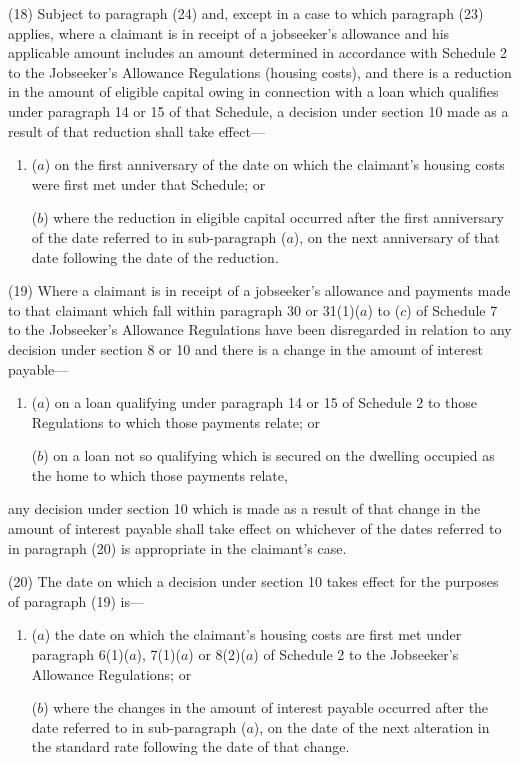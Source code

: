 \documentclass[12pt,a4paper]{article}
\begin{document}
(18) Subject to paragraph (24) and, except in a case to which paragraph (23) applies, where a claimant is in receipt of a jobseeker’s allowance and his applicable amount includes an amount determined in accordance with Schedule 2 to the Jobseeker’s Allowance Regulations (housing costs), and there is a reduction in the amount of eligible capital owing in connection with a loan which qualifies under paragraph 14 or 15 of that Schedule, a decision under section 10 made as a result of that reduction shall take effect—
\begin{enumerate}\item[]
($a$) on the first anniversary of the date on which the claimant’s housing costs were first met under that Schedule; or

($b$) where the reduction in eligible capital occurred after the first anniversary of the date referred to in sub-paragraph ($a$), on the next anniversary of that date following the date of the reduction.
\end{enumerate}

(19) Where a claimant is in receipt of a jobseeker’s allowance and payments made to that claimant which fall within paragraph 30 or 31(1)($a$) to ($c$) of Schedule 7 to the Jobseeker’s Allowance Regulations have been disregarded in relation to any decision under section 8 or 10 and there is a change in the amount of interest payable—
\begin{enumerate}\item[]
($a$) on a loan qualifying under paragraph 14 or 15 of Schedule 2 to those Regulations to which those payments relate; or

($b$) on a loan not so qualifying which is secured on the dwelling occupied as the home to which those payments relate,
\end{enumerate}
any decision under section 10 which is made as a result of that change in the amount of interest payable shall take effect on whichever of the dates referred to in paragraph (20) is appropriate in the claimant’s case.

(20) The date on which a decision under section 10 takes effect for the purposes of paragraph (19) is—
\begin{enumerate}\item[]
($a$) the date on which the claimant’s housing costs are first met under paragraph 6(1)($a$), 7(1)($a$) or 8(2)($a$) of Schedule 2 to the Jobseeker’s Allowance Regulations; or

($b$) where the changes in the amount of interest payable occurred after the date referred to in sub-paragraph ($a$), on the date of the next alteration in the standard rate following the date of that change.
\end{enumerate}
\end{document}

